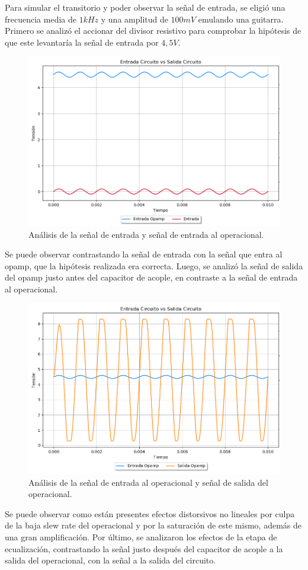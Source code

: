 Para simular el transitorio y poder observar la señal de entrada, se eligió una frecuencia media de $1kHz$ y una amplitud de $100mV$ emulando una guitarra.
Primero se analizó el accionar del divisor resistivo para comprobar la hipótesis de que este levantaría la señal de entrada por $4,5V$.
\begin{figure}[H]
	\centering
	\includegraphics[width=1\textwidth, trim={0 0 0 0}, clip]{Ejercicio5/Imagenes/Circuito_base/Sim/circuito_base_tran_vi_viop.png}
	\caption{Análisis de la señal de entrada y señal de entrada al operacional.}
	\label{fig:sim_base}
\end{figure}
Se puede observar contrastando la señal de entrada con la señal que entra al opamp, que la hipótesis realizada era correcta.
Luego, se analizó la señal de salida del opamp justo antes del capacitor de acople, en contraste a la señal de entrada al operacional.
\begin{figure}[H]
	\centering
	\includegraphics[width=1\textwidth, trim={0 0 0 0}, clip]{Ejercicio5/Imagenes/Circuito_base/Sim/circuito_base_tran_viop_voop.png}
	\caption{Análisis de la señal de entrada al operacional y señal de salida del operacional. }
	\label{fig:sim_base}
\end{figure}
Se puede observar como están presentes efectos distorsivos no lineales por culpa de la baja slew rate del operacional y por la saturación de este mismo, además de una gran amplificación.
Por último, se analizaron los efectos de la etapa de ecualización, contrastando la señal justo después del capacitor de acople a la salida del operacional, con la señal a la salida del circuito.

